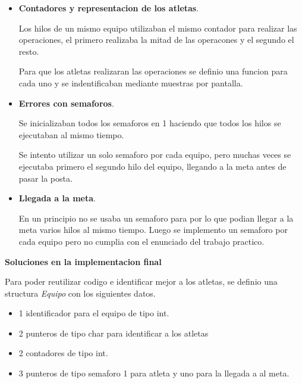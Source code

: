 \documentclass[a4paper, 14pt]{article}
\begin{document}
\begin{itemize}
\item \textbf{Contadores y representacion de los atletas}.\newline

  Los hilos de un mismo equipo utilizaban el mismo contador para realizar las operaciones, el primero realizaba la mitad de las operacones y el segundo el resto.\newline

  Para que los atletas realizaran las operaciones se definio una funcion para cada uno y se indentificaban mediante muestras por pantalla.
  
\item \textbf{Errores con semaforos}.\newline
  
  Se inicializaban todos los semaforos en 1 haciendo que todos los hilos se ejecutaban al mismo tiempo.\newline

  Se intento utilizar un solo semaforo por cada equipo, pero muchas veces se ejecutaba primero el segundo hilo del equipo,  llegando a la meta antes de pasar la posta.\newline

\item \textbf{Llegada a la meta}.\newline

  En un principio no se usaba un semaforo para por lo que podian llegar a la meta varios hilos al mismo tiempo. Luego se implemento un semaforo por cada equipo pero no cumplia con el enunciado del trabajo practico.  
\end{itemize}

\newpage

\textbf{\LARGE Soluciones en la implementacion final}\newline

Para poder reutilizar codigo e identificar mejor a los atletas, se definio una structura \emph{Equipo}  con los siguientes datos.

\begin{itemize}
\item 1 identificador para el equipo de tipo int.
\item 2 punteros de tipo char para identificar a los atletas
\item 2 contadores de tipo int.
\item 3 punteros de tipo semaforo 1 para atleta y uno para la llegada a al meta.
\end{itemize} 
\end{document}
